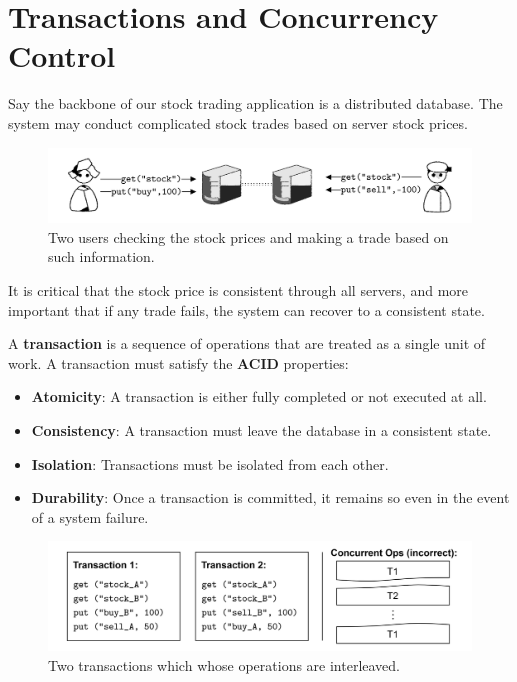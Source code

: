 \newpage 

\section{Transactions and Concurrency Control}

\noindent
Say the backbone of our stock trading application is a 
distributed database. The system may conduct complicated
stock trades based on server stock prices.
\begin{figure}[h]
    \centering
    \includegraphics[width=\textwidth]{Sections/trans/stock.png}
    \caption{Two users checking the stock prices and making a trade based on such information.}
    \label{fig:stock_trading}
\end{figure}

\noindent
It is critical that the stock price is consistent through all servers, and 
more important that if any trade fails, the system can recover to a consistent state.

\begin{Def}[Transaction]

    A \textbf{transaction} is a sequence of operations that are treated as a single unit of work.
    A transaction must satisfy the \textbf{ACID} properties:
    \begin{itemize}
        \item \textbf{Atomicity}: A transaction is either fully completed or not executed at all.
        \item \textbf{Consistency}: A transaction must leave the database in a consistent state.
        \item \textbf{Isolation}: Transactions must be isolated from each other.
        \item \textbf{Durability}: Once a transaction is committed, it remains so even in the event of a system failure.
    \end{itemize}
\end{Def}

\vspace{-0.5em}
\begin{figure}[h]
    \centering 
    \includegraphics[width=\textwidth]{Sections/trans/stock_2.png}
    \caption{Two transactions which whose operations are interleaved.}
    \label{fig:stock_trading}
\end{figure}

